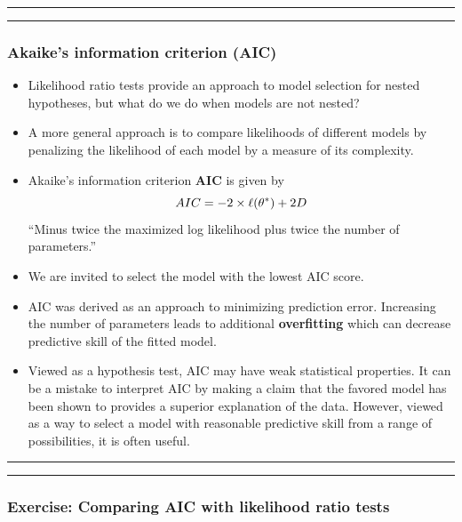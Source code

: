 \documentclass[]{article}
\begin{document}
\begin{center}\rule{0.5\linewidth}{\linethickness}\end{center}

\begin{center}\rule{0.5\linewidth}{\linethickness}\end{center}

\subsubsection{Akaike's information criterion
(AIC)}\label{akaikes-information-criterion-aic}

\begin{itemize}
\item
  Likelihood ratio tests provide an approach to model selection for
  nested hypotheses, but what do we do when models are not nested?
\item
  A more general approach is to compare likelihoods of different models
  by penalizing the likelihood of each model by a measure of its
  complexity.
\item
  Akaike's information criterion \textbf{AIC} is given by
  \[ AIC = -2 \times \ell(\theta^*) + 2D\] ``Minus twice the
  maximized log likelihood plus twice the number of parameters.''
\item
  We are invited to select the model with the lowest AIC score.
\item
  AIC was derived as an approach to minimizing prediction error.
  Increasing the number of parameters leads to additional
  \textbf{overfitting} which can decrease predictive skill of the fitted
  model.
\item
  Viewed as a hypothesis test, AIC may have weak statistical properties.
  It can be a mistake to interpret AIC by making a claim that the
  favored model has been shown to provides a superior explanation of the
  data. However, viewed as a way to select a model with reasonable
  predictive skill from a range of possibilities, it is often useful.
\end{itemize}

\begin{center}\rule{0.5\linewidth}{\linethickness}\end{center}

\begin{center}\rule{0.5\linewidth}{\linethickness}\end{center}

\subsubsection{Exercise: Comparing AIC with likelihood ratio
tests}\label{exercise-comparing-aic-with-likelihood-ratio-tests}
\end{document}
